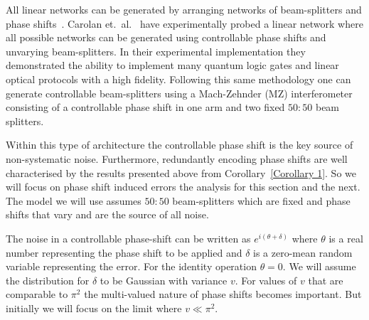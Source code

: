 \documentclass[aps,pra,twocolumn,superscriptaddress,numerical,floatfix]{revtex4-1}
\begin{document}


All linear networks can be generated by arranging networks of beam-splitters and phase shifts~\cite{reck}.  Carolan et.~al.~\cite{ULO} have experimentally probed a linear network where all possible networks can be generated using controllable phase shifts and unvarying beam-splitters.  In their experimental implementation they demonstrated the ability to implement many quantum logic gates and linear optical protocols with a high fidelity.  Following this same methodology one can generate controllable beam-splitters using a Mach-Zehnder (MZ) interferometer consisting of a controllable phase shift in one arm and two fixed $50:50$ beam splitters.

Within this type of architecture the controllable phase shift is the key source of non-systematic noise.  Furthermore, redundantly encoding phase shifts are well characterised by the results presented above from Corollary~\ref{Corollary 1}.  So we will focus on phase shift induced errors the analysis for this section and the next.  The model we will use assumes $50:50$ beam-splitters which are fixed and phase shifts that vary and are the source of all noise.

The noise in a controllable phase-shift can be written as $e^{i(\theta+\delta)}$ where $\theta$ is a real number representing the phase shift to be applied and $\delta$ is a zero-mean random variable representing the error.  For the identity operation $\theta=0$.  We will assume the distribution for $\delta$ to be Gaussian with variance $v$.  For values of $v$ that are comparable to $\pi^2$ the multi-valued nature of phase shifts becomes important.  But initially we will focus on the limit where $v \ll \pi^2$.

\end{document}

